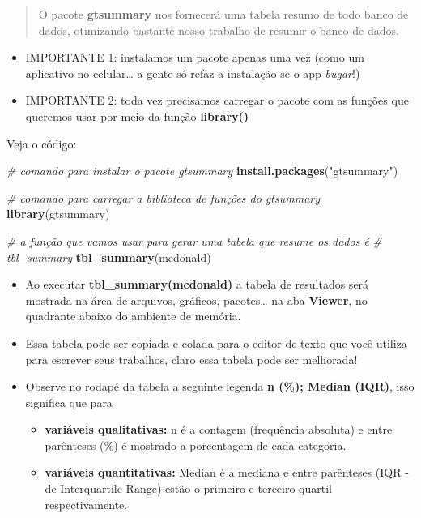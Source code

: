 \documentclass[
]{book}
\newenvironment{Shaded}{\begin{snugshade}}{\end{snugshade}}
\newcommand{\CommentTok}[1]{\textcolor[rgb]{0.56,0.35,0.01}{\textit{#1}}}
\newcommand{\FunctionTok}[1]{\textcolor[rgb]{0.13,0.29,0.53}{\textbf{#1}}}
\newcommand{\NormalTok}[1]{#1}
\newcommand{\StringTok}[1]{\textcolor[rgb]{0.31,0.60,0.02}{#1}}
\begin{document}
\begin{quote}
O pacote \textbf{gtsummary} nos fornecerá uma tabela resumo de todo banco de dados, otimizando bastante nosso trabalho de resumir o banco de dados.
\end{quote}

\begin{itemize}
\item
  IMPORTANTE 1: instalamos um pacote apenas uma vez (como um aplicativo no celular\ldots{} a gente só refaz a instalação se o app \emph{bugar}!)
\item
  IMPORTANTE 2: toda vez precisamos carregar o pacote com as funções que queremos usar por meio da função \textbf{library()}
\end{itemize}

Veja o código:

\begin{Shaded}
\begin{Highlighting}[]
\CommentTok{\# comando para instalar o pacote gtsummary}
\FunctionTok{install.packages}\NormalTok{(}\StringTok{"gtsummary"}\NormalTok{)}

\CommentTok{\# comando para carregar a biblioteca de funções do gtsummary}
\FunctionTok{library}\NormalTok{(gtsummary)}

\CommentTok{\# a função que vamos usar para gerar uma tabela que resume os dados é}
\CommentTok{\# tbl\_summary}
\FunctionTok{tbl\_summary}\NormalTok{(mcdonald)}
\end{Highlighting}
\end{Shaded}

\begin{itemize}
\item
  Ao executar \textbf{tbl\_summary(mcdonald)} a tabela de resultados será mostrada na área de arquivos, gráficos, pacotes\ldots{} na aba \textbf{Viewer}, no quadrante abaixo do ambiente de memória.
\item
  Essa tabela pode ser copiada e colada para o editor de texto que você utiliza para escrever seus trabalhos, claro essa tabela pode ser melhorada!
\item
  Observe no rodapé da tabela a seguinte legenda \textbf{n (\%); Median (IQR)}, isso significa que para

  \begin{itemize}
  \item
    \textbf{variáveis qualitativas:} n é a contagem (frequência absoluta) e entre parênteses (\%) é mostrado a porcentagem de cada categoria.
  \item
    \textbf{variáveis quantitativas:} Median é a mediana e entre parênteses (IQR - de Interquartile Range) estão o primeiro e terceiro quartil respectivamente.
  \end{itemize}
\end{itemize}
\end{document}
